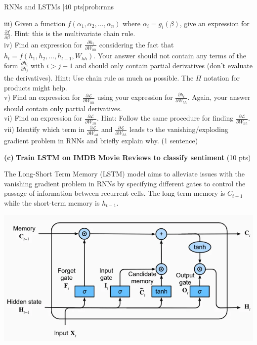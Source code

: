 \begin{problem}{RNNs and LSTMs \hfill [40 pts]}{prob:rnns}
\begin{adjustwidth}{2em}{2em}
\begin{adjustwidth}{2em}{2em}
    iii) Given a function $f(\alpha_1, \alpha_2, \dots, \alpha_n)$ where $\alpha_i = g_i(\beta)$, give an expression for $\frac{\partial f}{\partial \beta}$. Hint: this is the multivariate chain rule. \\

    iv) Find an expression for $\frac{\partial h_{t}}{\partial W_{hh}}$ considering the fact that $h_t = f(h_1, h_2, \dots, h_{t - 1}, W_{hh})$. Your answer should not contain any terms of the form $\frac{\partial h_i}{\partial h_j}$ with $i > j + 1$ and should only contain partial derivatives (don't evaluate the derivatives). Hint: Use chain rule as much as possible. The $\Pi$ notation for products might help. \\

    v) Find an expression for $\frac{\partial \mathcal{L}}{\partial W_{hh}}$ using your expression for $\frac{\partial h_{t}}{\partial W_{hh}}$. Again, your answer should contain only partial derivatives. \\

    vi) Find an expression for $\frac{\partial \mathcal{L}}{\partial W_{xh}}$. Hint: Follow the same procedure for finding $\frac{\partial \mathcal{L}}{\partial W_{hh}}$. \\

    vii) Identify which term in $\frac{\partial \mathcal{L}}{\partial W_{xh}}$ and $\frac{\partial \mathcal{L}}{\partial W_{hh}}$ leads to the vanishing/exploding gradient problem in RNNs and briefly explain why. (1 sentence) \\
    
    
    \end{adjustwidth} 
    \vspace{5px}

    
    \textbf{(c)} \textbf{Train LSTM on IMDB Movie Reviews to classify sentiment} \hfill (10 pts)
    \begin{adjustwidth}{2em}{2em}

    The Long-Short Term Memory (LSTM) model aims to alleviate issues with the vanishing gradient problem in RNNs by specifying different gates to control the passage of information between recurrent cells. The long term memory is $C_{t - 1}$ while the short-term memory is $h_{t - 1}$.

    \begin{center}
        \includegraphics[width=0.75\linewidth]{media/lstm_fig.png}
    \end{center}


\end{adjustwidth}
\end{adjustwidth}
\end{problem}

